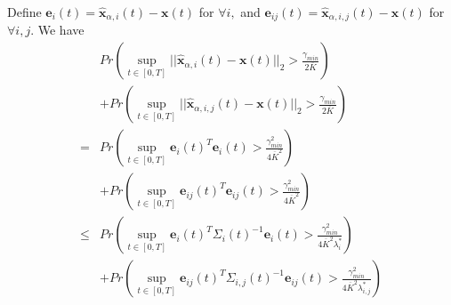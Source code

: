 \documentclass[journal]{IEEEtran}
\begin{document}
Define $\mathbf{e}_i(t) = \mathbf{\hat{x}}_{\alpha,i}(t)-\mathbf{x}(t)$ for $\forall i,$ and $\mathbf{e}_{ij}(t) = \mathbf{\hat{x}}_{\alpha,i,j}(t)-\mathbf{x}(t)$ for $\forall i, j.$ We have
\begin{equation*}
    \begin{array}{ll}
        &Pr\left(\sup_{t \in [0,T]} ||\mathbf{\hat{x}}_{\alpha,i}(t)-\mathbf{x}(t)||_2 > \frac{\gamma_{min}}{2\overline{K}}\right) \\
        &+ Pr\left(\sup_{t \in [0,T]} ||\mathbf{\hat{x}}_{\alpha,i,j}(t)-\mathbf{x}(t)||_2 > \frac{\gamma_{min}}{2\overline{K}}\right) \\
        = &Pr\left(\sup_{t \in [0,T]} \mathbf{e}_i(t)^T\mathbf{e}_i(t) > \frac{\gamma_{min}^2}{4\overline{K}^2}\right) \\
        &+ Pr\left(\sup_{t \in [0,T]} \mathbf{e}_{ij}(t)^T\mathbf{e}_{ij}(t) > \frac{\gamma_{min}^2}{4\overline{K}^2}\right) \\
        \leq &Pr\left(\sup_{t \in [0,T]} \mathbf{e}_i(t)^T{\Sigma_i(t)}^{-1}\mathbf{e}_i(t) > \frac{\gamma_{min}^2}{4\overline{K}^2\lambda_i^{\ast}}\right) \\
        &+ Pr\left(\sup_{t \in [0,T]} \mathbf{e}_{ij}(t)^T{\Sigma_{i,j}(t)}^{-1}\mathbf{e}_{ij}(t) > \frac{\gamma_{min}^2}{4\overline{K}^2\lambda_{i,j}^{\ast}}\right) 
    \end{array}
\end{equation*}
\end{document}
